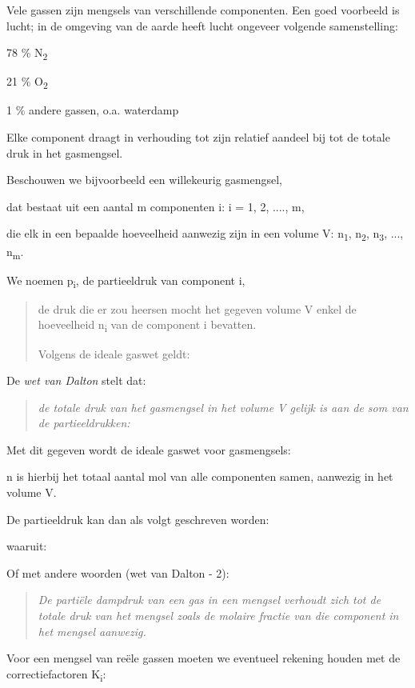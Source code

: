 \documentclass[]{article}
\begin{document}
Vele gassen zijn mengsels van verschillende componenten. Een goed
voorbeeld is lucht; in de omgeving van de aarde heeft lucht ongeveer
volgende samenstelling:

78 \% N\textsubscript{2}

21 \% O\textsubscript{2}

1 \% andere gassen, o.a. waterdamp

Elke component draagt in verhouding tot zijn relatief aandeel bij tot de
totale druk in het gasmengsel.

Beschouwen we bijvoorbeeld een willekeurig gasmengsel,

dat bestaat uit een aantal m componenten i: i = 1, 2, ...., m,

die elk in een bepaalde hoeveelheid aanwezig zijn in een volume V:
n\textsubscript{1}, n\textsubscript{2}, n\textsubscript{3}, ...,
n\textsubscript{m}.

We noemen p\textsubscript{i}, de partieeldruk van component i,

\begin{quote}
de druk die er zou heersen mocht het gegeven volume V enkel de
hoeveelheid n\textsubscript{i} van de component i bevatten.

Volgens de ideale gaswet geldt:
\end{quote}

De \emph{wet van Dalton} stelt dat:

\begin{quote}
\emph{de totale druk van het gasmengsel in het volume V gelijk is aan de
som van de partieeldrukken:}
\end{quote}

Met dit gegeven wordt de ideale gaswet voor gasmengsels:

n is hierbij het totaal aantal mol van alle componenten samen, aanwezig
in het volume V.

De partieeldruk kan dan als volgt geschreven worden:

waaruit:

Of met andere woorden (wet van Dalton - 2):

\begin{quote}
\emph{De partiële dampdruk van een gas in een mengsel verhoudt zich tot
de totale druk van het mengsel zoals de molaire fractie van die
component in het mengsel aanwezig.}
\end{quote}

Voor een mengsel van reële gassen moeten we eventueel rekening houden
met de correctiefactoren K\textsubscript{i}:
\end{document}
